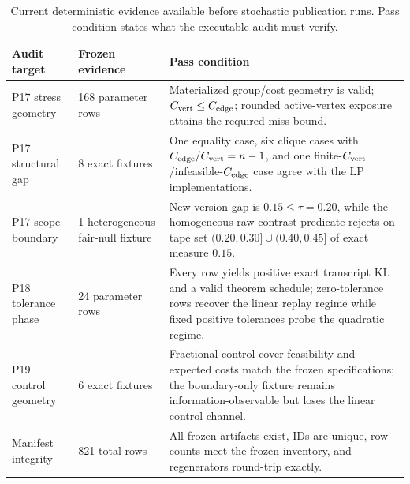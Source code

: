 \begin{table}[H]
\centering
\caption{Current deterministic evidence available before stochastic publication
runs. Pass condition states what the executable audit must verify.}
\label{arch:tab:deterministic-evidence}
\normalsize
\begin{tabular}{@{}p{}p{}p{}@{}}
\toprule
Audit target & Frozen evidence & Pass condition \\
\midrule
P17 stress geometry & 168 parameter rows & Materialized group/cost geometry is valid; $C_{\rm vert}\le C_{\rm edge}$; rounded active-vertex exposure attains the required miss bound. \\
P17 structural gap & 8 exact fixtures & One equality case, six clique cases with $C_{\rm edge}/C_{\rm vert}=n-1$, and one finite-$C_{\rm vert}$/infeasible-$C_{\rm edge}$ case agree with the LP implementations. \\
P17 scope boundary & 1 heterogeneous fair-null fixture & New-version gap is $0.15\le\tau=0.20$, while the homogeneous raw-contrast predicate rejects on tape set $(0.20,0.30]\cup(0.40,0.45]$ of exact measure $0.15$. \\
P18 tolerance phase & 24 parameter rows & Every row yields positive exact transcript KL and a valid theorem schedule; zero-tolerance rows recover the linear replay regime while fixed positive tolerances probe the quadratic regime. \\
P19 control geometry & 6 exact fixtures & Fractional control-cover feasibility and expected costs match the frozen specifications; the boundary-only fixture remains information-observable but loses the linear control channel. \\
Manifest integrity & 821 total rows & All frozen artifacts exist, IDs are unique, row counts meet the frozen inventory, and regenerators round-trip exactly. \\
\bottomrule
\end{tabular}
\end{table}



